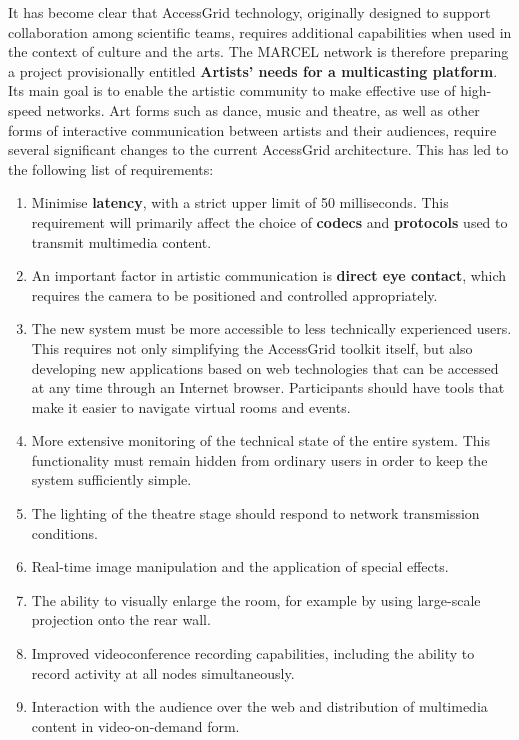 It has become clear that AccessGrid technology, originally designed to support collaboration among scientific teams, requires additional capabilities when used in the context of culture and the arts. The MARCEL network is therefore preparing a project provisionally entitled \textbf{Artists' needs for a multicasting platform}. Its main goal is to enable the artistic community to make effective use of high-speed networks. Art forms such as dance, music and theatre, as well as other forms of interactive communication between artists and their audiences, require several significant changes to the current AccessGrid architecture. This has led to the following list of requirements:

\begin{enumerate}

\item \label{item:MinLatency}
Minimise \textbf{latency}, with a strict upper limit of 50 milliseconds. This requirement will primarily affect the choice of \textbf{codecs} and \textbf{protocols} used to transmit multimedia content.

\item \label{item:EyeContact}
An important factor in artistic communication is \textbf{direct eye contact}, which requires the camera to be positioned and controlled appropriately.

\item The new system must be more accessible to less technically experienced users. This requires not only simplifying the AccessGrid toolkit itself, but also developing new applications based on web technologies that can be accessed at any time through an Internet browser. Participants should have tools that make it easier to navigate virtual rooms and events.

\item More extensive monitoring of the technical state of the entire system. This functionality must remain hidden from ordinary users in order to keep the system sufficiently simple.

\item \label{item:TheatricalLightning}
The lighting of the theatre stage should respond to network transmission conditions.

\item \label{item:RealTimeEffects}
Real-time image manipulation and the application of special effects.

\item \label{itme:RearViewProjection} The ability to visually enlarge the room, for example by using large-scale projection onto the rear wall.

\item \label{item:RecAllNodes}
Improved videoconference recording capabilities, including the ability to record activity at all nodes simultaneously.

\item Interaction with the audience over the web and distribution of multimedia content in video-on-demand form.
\end{enumerate}

